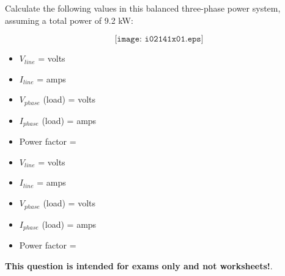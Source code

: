 

Calculate the following values in this balanced three-phase power system, assuming a total power of 9.2 kW:

$$\texttt{[image: i02141x01.eps]}$$

\begin{itemize}
\item{} $V_{line}$ = \underbar{\hskip 50pt} volts
\vskip 10pt
\item{} $I_{line}$ = \underbar{\hskip 50pt} amps 
\vskip 10pt
\item{} $V_{phase}$ (load) = \underbar{\hskip 50pt} volts 
\vskip 10pt
\item{} $I_{phase}$ (load) = \underbar{\hskip 50pt} amps 
\vskip 10pt
\item{} Power factor = \underbar{\hskip 50pt}
\end{itemize}







\begin{itemize}
\item{} $V_{line}$ =  volts
\vskip 10pt
\item{} $I_{line}$ =  amps 
\vskip 10pt
\item{} $V_{phase}$ (load) =  volts 
\vskip 10pt
\item{} $I_{phase}$ (load) =  amps 
\vskip 10pt
\item{} Power factor = 
\end{itemize}








{\bf This question is intended for exams only and not worksheets!}.


